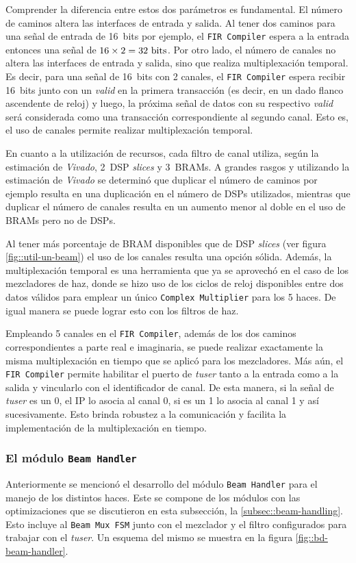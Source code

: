 \documentclass[../../main.tex]{subfiles}
\begin{document}
Comprender la diferencia entre estos dos parámetros es fundamental. El número de caminos altera las interfaces de entrada y salida. Al tener dos caminos para una señal de entrada de 16~bits por ejemplo, el \texttt{FIR Compiler} espera a la entrada entonces una señal de $16 \times 2 = 32~\textrm{bits}$. Por otro lado, el número de canales no altera las interfaces de entrada y salida, sino que realiza multiplexación temporal. Es decir, para una señal de 16~bits con 2 canales, el \texttt{FIR Compiler} espera recibir 16~bits junto con un \textit{valid} en la primera transacción (es decir, en un dado flanco ascendente de reloj) y luego, la próxima señal de datos con su respectivo \textit{valid} será considerada como una transacción correspondiente al segundo canal. Esto es, el uso de canales permite realizar multiplexación temporal.

En cuanto a la utilización de recursos, cada filtro de canal utiliza, según la estimación de \textit{Vivado}, 2~DSP \textit{slices} y 3~BRAMs. A grandes rasgos y utilizando la estimación de \textit{Vivado} se determinó que duplicar el número de caminos por ejemplo resulta en una duplicación en el número de DSPs utilizados, mientras que duplicar el número de canales resulta en un aumento menor al doble en el uso de BRAMs pero no de DSPs.

Al tener más porcentaje de BRAM disponibles que de DSP \textit{slices} (ver figura \ref{fig::util-un-beam}) el uso de los canales resulta una opción sólida. Además, la multiplexación temporal es una herramienta que ya se aprovechó en el caso de los mezcladores de haz, donde se hizo uso de los ciclos de reloj disponibles entre dos datos válidos para emplear un único \texttt{Complex Multiplier} para los 5 haces. De igual manera se puede lograr esto con los filtros de haz.

Empleando 5 canales en el \texttt{FIR Compiler}, además de los dos caminos correspondientes a parte real e imaginaria, se puede realizar exactamente la misma multiplexación en tiempo que se aplicó para los mezcladores. Más aún, el \texttt{FIR Compiler} permite habilitar el puerto de \textit{tuser} tanto a la entrada como a la salida y vincularlo con el identificador de canal. De esta manera, si la señal de \textit{tuser} es un 0, el IP lo asocia al canal 0, si es un 1 lo asocia al canal 1 y así sucesivamente. Esto brinda robustez a la comunicación y facilita la implementación de la multiplexación en tiempo.

\subsubsection{El módulo \texttt{Beam Handler}}
Anteriormente se mencionó el desarrollo del módulo \texttt{Beam Handler} para el manejo de los distintos haces. Este se compone de los módulos con las optimizaciones que se discutieron en esta subsección, la \ref{subsec::beam-handling}. Esto incluye al \texttt{Beam Mux FSM} junto con el mezclador y el filtro configurados para trabajar con el \textit{tuser}. Un esquema del mismo se muestra en la figura \ref{fig::bd-beam-handler}.
\end{document}
